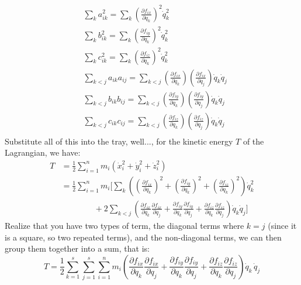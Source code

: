 \begin{align}
 & \sum_{k} a_{ik}^{2} = \sum_{k} \left( \frac{\partial f_{ix}}{\partial q_{k}} \right)^{2} \dot{q}_{k}^{2} \\
 & \sum_{k} b_{ik}^{2} = \sum_{k} \left( \frac{\partial f_{iy}}{\partial q_{k}} \right)^{2} \dot{q}_{k}^{2} \\
 &\sum_{k} c_{ik}^{2} = \sum_{k} \left( \frac{\partial f_{iz}}{\partial q_{k}} \right)^{2} \dot{q}_{k}^{2} \\
 & \sum_{k<j} a_{ik}a_{ij} = \sum_{k<j} \left( \frac{\partial f_{ix}}{\partial q_{k}} \right)\left( \frac{\partial f_{ix}}{\partial q_{j}} \right) \dot{q}_{k} \dot{q}_{j}\\
 & \sum_{k<j} b_{ik}b_{ij} = \sum_{k<j} \left( \frac{\partial f_{iy}}{\partial q_{k}} \right)\left( \frac{\partial f_{iy}}{\partial q_{j}} \right) \dot{q}_{k} \dot{q}_{j}\\
 & \sum_{k<j} c_{ik}c_{ij} = \sum_{k<j} \left( \frac{\partial f_{iz}}{\partial q_{k}} \right)\left( \frac{\partial f_{iz}}{\partial q_{j}} \right) \dot{q}_{k} \dot{q}_{j}\\
\end{align}
Substitute all of this into the tray, well..., for the kinetic energy $T$ of the Lagrangian, we have: 
\begin{align}
T 
&= \frac{1}{2} \sum_{i=1}^{n} m_{i} \left( \dot{x}_{i}^{2} + \dot{y}_{i}^{2} + \dot{z}_{i}^{2} \right) \nonumber \\
&= \frac{1}{2} \sum_{i=1}^{n} m_i \Biggl[
  \sum_{k} \left(
    \left( \frac{\partial f_{ix}}{\partial q_k} \right)^2
    + \left( \frac{\partial f_{iy}}{\partial q_k} \right)^2
    + \left( \frac{\partial f_{iz}}{\partial q_k} \right)^2
  \right) \dot{q}_k^2 \nonumber \\
&\qquad\qquad + 2 \sum_{k < j} \left(
    \frac{\partial f_{ix}}{\partial q_k} \frac{\partial f_{ix}}{\partial q_j}
    + \frac{\partial f_{iy}}{\partial q_k} \frac{\partial f_{iy}}{\partial q_j}
    + \frac{\partial f_{iz}}{\partial q_k} \frac{\partial f_{iz}}{\partial q_j}
  \right) \dot{q}_k \dot{q}_j
\Biggr]
\end{align}
Realize that you have two types of term, the diagonal terms where $k=j$ (since it is a square, so two repeated terms), and the non-diagonal terms, we can then group them together into a sum, that is: 
\begin{equation}
    T = \frac{1}{2}\sum_{k=1}^s\sum_{j=1}^s
\sum_{i=1}^n m_i
       \left(
         \frac{\partial f_{ix}}{\partial q_k}\frac{\partial f_{ix}}{\partial q_j}
        +\frac{\partial f_{iy}}{\partial q_k}\frac{\partial f_{iy}}{\partial q_j}
        +\frac{\partial f_{iz}}{\partial q_k}\frac{\partial f_{iz}}{\partial q_j}
       \right)
     \dot q_k\,\dot q_j
\end{equation}
